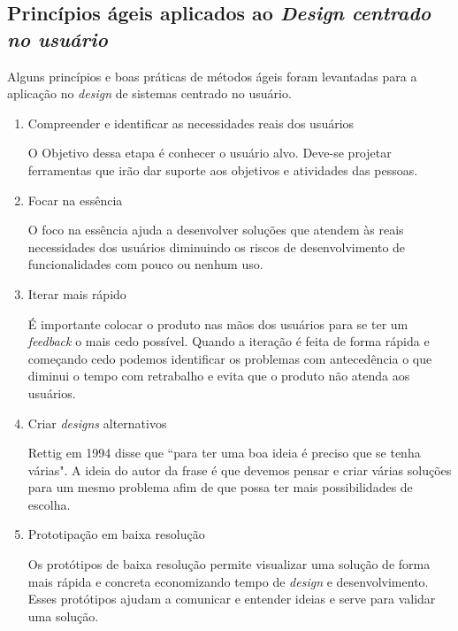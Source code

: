 \begin{itemize}
\end{itemize}

\newpage

\subsection{Princípios ágeis aplicados ao \emph{Design centrado no usuário}}

	Alguns princípios e boas práticas de métodos ágeis foram levantadas para a aplicação no \emph{design} de sistemas centrado no usuário.

\begin{enumerate}

\item Compreender e identificar as necessidades reais dos usuários

O Objetivo dessa etapa é conhecer o usuário alvo. Deve-se projetar ferramentas que irão dar suporte aos objetivos e atividades das pessoas.

\item Focar na essência

O foco na essência ajuda a desenvolver soluções que atendem às reais necessidades dos usuários diminuindo os riscos de desenvolvimento de funcionalidades com pouco ou nenhum uso.


\item Iterar mais rápido

	É importante colocar o produto nas mãos dos usuários para se ter um \textit{feedback} o mais cedo possível. Quando a iteração é feita de forma rápida e começando cedo podemos identificar os problemas com antecedência o que diminui o tempo com retrabalho e evita que o produto não atenda aos usuários.
	

\item Criar \emph{designs} alternativos

	Rettig em 1994 disse que ``para ter uma boa ideia é preciso que se tenha várias". A ideia do autor da frase é que devemos pensar e criar várias soluções para um mesmo problema afim de que possa ter mais possibilidades de escolha. 


\item Prototipação em baixa resolução

Os protótipos de baixa resolução permite visualizar uma solução de forma mais rápida e concreta economizando tempo de \emph{design} e desenvolvimento. Esses protótipos ajudam a comunicar e entender ideias e serve para validar uma solução. 


\end{enumerate}

